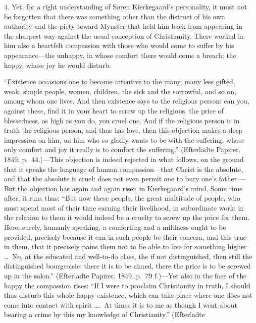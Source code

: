 \documentclass[12pt,a4paper]{book}
\newcommand{\opage}[1]{\marginnote{\footnotesize\textit{[#1]}}}
\begin{document}
4. Yet, for a right understanding of Søren Kierkegaard's personality, it
must not be forgotten that there was something other than the distrust
of his own authority and the piety toward Mynster that held him back
from appearing in the sharpest way against the usual conception of
Christianity. There worked in him also a heartfelt compassion with those
who would come to suffer by his appearance---the unhappy, in whose
comfort there would come a breach; the happy, whose joy he would
disturb.

``Existence occasions one to become attentive to the many, many less
gifted, weak, simple people, women, children, the sick and the
sorrowful, and so on, among whom one lives. And then existence says to
the religious person: can you, against these, find it in your heart to
screw up the religious, the price of blessedness, as high as you do, you
cruel one. And if the religious person is in truth the
\opage{137}religious person, and thus has love, then this objection makes a
deep impression on him, on him who so gladly wants to be with the
suffering, whose only comfort and joy it really is to comfort the
suffering.'' (Efterladte Papirer. 1849. p.~44.)---This objection is
indeed rejected in what follows, on the ground that it speaks the
language of human compassion---that Christ is the absolute, and that the
absolute is cruel: does not even permit one to bury one's father.---But
the objection has again and again risen in Kierkegaard's mind. Some time
after, it runs thus: ``But now these people, the great multitude of
people, who must spend most of their time earning their livelihood, in
subordinate work: in the relation to them it would indeed be a cruelty
to screw up the price for them. Here, surely, humanly speaking, a
comforting and a mildness ought to be provided, precisely because it can
in such people be their concern, and this true in them, that it
precisely pains them not to be able to live for something higher \dots\
No, at the educated and well-to-do class, the if not distinguished, then
still the distinguished bourgeoisie: there it is to be aimed, there the
price is to be screwed up in the salon.'' (Efterladte Papirer. 1849.
p.~79 f.)---Yet also in the face of the happy the compassion rises: ``If
I were to proclaim Christianity in truth, I should thus disturb this
whole happy existence, which can take place where one does not come into
contact with spirit \dots.\ At times it is to me as though I went about
bearing a crime by this my knowledge of Christianity.'' (Efterladte
\end{document}
